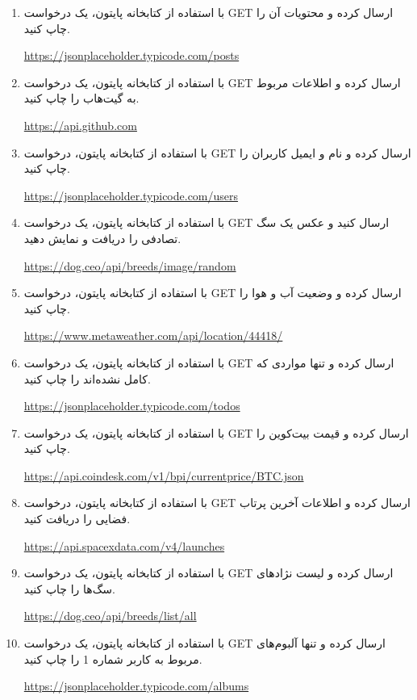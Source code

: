 \documentclass[a4paper,12pt]{article}
\begin{document}
	\begin{enumerate}
		\item با استفاده از کتابخانه  پایتون، یک درخواست GET ارسال کرده و محتویات آن را چاپ کنید.
		\begin{flushleft}
			\url{https://jsonplaceholder.typicode.com/posts}
		\end{flushleft}
		\item با استفاده از کتابخانه  پایتون، یک درخواست GET ارسال کرده و اطلاعات مربوط به گیت‌هاب را چاپ کنید.
		\begin{flushleft}
			\url{https://api.github.com}
		\end{flushleft}
		\item با استفاده از کتابخانه  پایتون، درخواست GET ارسال کرده و نام و ایمیل کاربران را چاپ کنید.
		\begin{flushleft}
			\url{https://jsonplaceholder.typicode.com/users}
		\end{flushleft}
		\item با استفاده از کتابخانه  پایتون، یک درخواست GET ارسال کنید و عکس یک سگ تصادفی را دریافت و نمایش دهید.
		\begin{flushleft}
			\url{https://dog.ceo/api/breeds/image/random}
		\end{flushleft}
		\item با استفاده از کتابخانه  پایتون، درخواست GET ارسال کرده و وضعیت آب و هوا را چاپ کنید.
		\begin{flushleft}
			\url{https://www.metaweather.com/api/location/44418/}
		\end{flushleft}
		\item با استفاده از کتابخانه  پایتون، یک درخواست GET ارسال کرده و تنها مواردی که کامل نشده‌اند را چاپ کنید.
		\begin{flushleft}
			\url{https://jsonplaceholder.typicode.com/todos}
		\end{flushleft}
		\item با استفاده از کتابخانه  پایتون، یک درخواست GET ارسال کرده و قیمت بیت‌کوین را چاپ کنید.
		\begin{flushleft}
			\url{https://api.coindesk.com/v1/bpi/currentprice/BTC.json}
		\end{flushleft}
		\item با استفاده از کتابخانه  پایتون، درخواست GET ارسال کرده و اطلاعات آخرین پرتاب فضایی را دریافت کنید.
		\begin{flushleft}
			\url{https://api.spacexdata.com/v4/launches}
		\end{flushleft}
		\item با استفاده از کتابخانه  پایتون، یک درخواست GET ارسال کرده و لیست نژادهای سگ‌ها را چاپ کنید.
		\begin{flushleft}
			\url{https://dog.ceo/api/breeds/list/all}
		\end{flushleft}
		\item با استفاده از کتابخانه  پایتون، یک درخواست GET ارسال کرده و تنها آلبوم‌های مربوط به کاربر شماره 1 را چاپ کنید.
		\begin{flushleft}
			\url{https://jsonplaceholder.typicode.com/albums}
		\end{flushleft}
	\end{enumerate}
	
\end{document}
